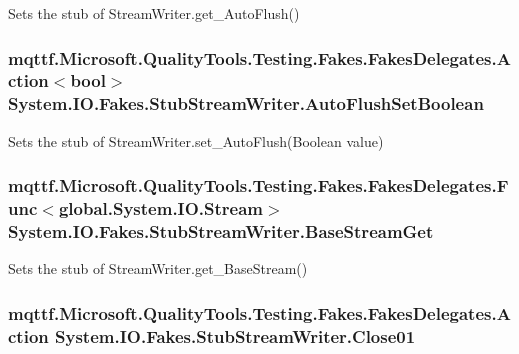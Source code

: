 Sets the stub of Stream\-Writer.\-get\-\_\-\-Auto\-Flush()

\hypertarget{class_system_1_1_i_o_1_1_fakes_1_1_stub_stream_writer_ab6bcac5ad1d5d259cca124e7ab8922c9}{
\subsubsection[{Auto\-Flush\-Set\-Boolean}]{\setlength{\rightskip}{0pt plus 5cm}mqttf.\-Microsoft.\-Quality\-Tools.\-Testing.\-Fakes.\-Fakes\-Delegates.\-Action$<$bool$>$ System.\-I\-O.\-Fakes.\-Stub\-Stream\-Writer.\-Auto\-Flush\-Set\-Boolean}}\label{class_system_1_1_i_o_1_1_fakes_1_1_stub_stream_writer_ab6bcac5ad1d5d259cca124e7ab8922c9}


Sets the stub of Stream\-Writer.\-set\-\_\-\-Auto\-Flush(\-Boolean value)

\hypertarget{class_system_1_1_i_o_1_1_fakes_1_1_stub_stream_writer_a2dbf72d986db840d4b7367d4c187727e}{
\subsubsection[{Base\-Stream\-Get}]{\setlength{\rightskip}{0pt plus 5cm}mqttf.\-Microsoft.\-Quality\-Tools.\-Testing.\-Fakes.\-Fakes\-Delegates.\-Func$<$global.\-System.\-I\-O.\-Stream$>$ System.\-I\-O.\-Fakes.\-Stub\-Stream\-Writer.\-Base\-Stream\-Get}}\label{class_system_1_1_i_o_1_1_fakes_1_1_stub_stream_writer_a2dbf72d986db840d4b7367d4c187727e}


Sets the stub of Stream\-Writer.\-get\-\_\-\-Base\-Stream()

\hypertarget{class_system_1_1_i_o_1_1_fakes_1_1_stub_stream_writer_a656c73a4ba5edfb514d5493323bbd53c}{
\subsubsection[{Close01}]{\setlength{\rightskip}{0pt plus 5cm}mqttf.\-Microsoft.\-Quality\-Tools.\-Testing.\-Fakes.\-Fakes\-Delegates.\-Action System.\-I\-O.\-Fakes.\-Stub\-Stream\-Writer.\-Close01}}\label{class_system_1_1_i_o_1_1_fakes_1_1_stub_stream_writer_a656c73a4ba5edfb514d5493323bbd53c}


